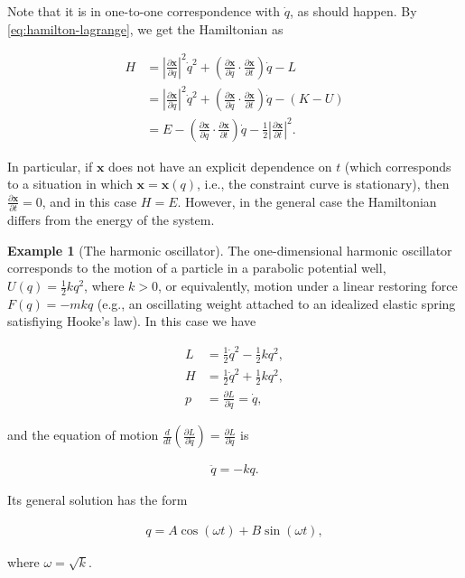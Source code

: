 \documentclass[11pt]{report}
\theoremstyle{plain}
\theoremstyle{definition}
\newtheorem{example}[thm]{Example}
\begin{document}
\noindent Note that it is in one-to-one correspondence with
$\dot{q}$, as should happen. By
\eqref{eq:hamilton-lagrange}, we get the Hamiltonian as

\begin{align*}
H &=
\left|\frac{\partial \mathbf{x}}{\partial q}\right|^2 \dot{q}^2 + \left(\frac{\partial \mathbf{x}}{\partial q}\cdot\frac{\partial \mathbf{x}}{\partial t}\right)\dot{q} - L \\
&=
\left|\frac{\partial \mathbf{x}}{\partial q}\right|^2 \dot{q}^2 + \left(\frac{\partial \mathbf{x}}{\partial q}\cdot\frac{\partial \mathbf{x}}{\partial t}\right)\dot{q} - (K-U) \\
&= E - \left(\frac{\partial \mathbf{x}}{\partial q}\cdot\frac{\partial \mathbf{x}}{\partial t}\right)\dot{q} -
\tfrac12\left|\frac{\partial \mathbf{x}}{\partial t}\right|^2.
\end{align*}

\noindent In particular, if $\mathbf{x}$ does not have an
explicit dependence on $t$ (which corresponds to a
situation in which $\mathbf{x}=\mathbf{x}(q)$, i.e.,
the constraint curve is stationary), then
$\frac{\partial \mathbf{x}}{\partial t}=0$, and in
this case $H=E$. However, in the general case the
Hamiltonian differs from the energy of the system.

\begin{example}[The harmonic oscillator]
The one-dimensional harmonic oscillator corresponds to
the motion of a particle in a parabolic potential
well, $U(q)=\tfrac12 k q^2$, where $k>0$, or
equivalently, motion under a linear restoring force
$F(q)=-m k q$ (e.g., an oscillating weight attached to
an idealized elastic spring satisfiying Hooke's law).
In this case we have

\begin{align*}
L &= \tfrac12 \dot{q}^2 - \tfrac12 kq^2, \\
H &= \tfrac12 \dot{q}^2 + \tfrac12 kq^2, \\
p &= \frac{\partial L}{\partial \dot{q}} = \dot{q},
\end{align*}

\noindent and the equation of motion
$\frac{d}{dt}\left(\frac{\partial L}{\partial
\dot{q}}\right)=\frac{\partial L}{\partial q}$
is

\begin{align*}
\ddot{q} = -kq.
\end{align*}

\noindent Its general solution has the form

\begin{align*}
q = A\cos(\omega t) + B \sin(\omega t),
\end{align*}

\noindent where $\omega= \sqrt{k}$.
\end{example}
\end{document}
